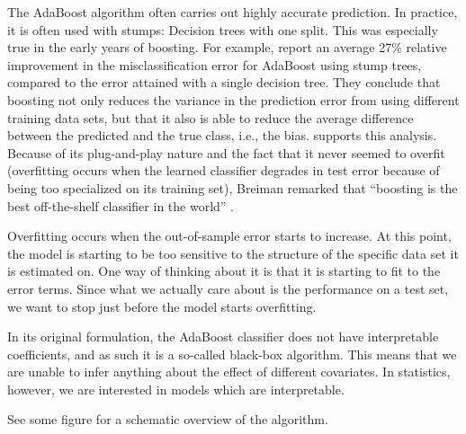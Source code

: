 The AdaBoost algorithm often carries out highly accurate prediction. In practice, it is often used with stumps: Decision trees with one split. This was especially true in the early years of boosting. For example, \citet{bauer-kohavi} report an average 27\% relative improvement in the misclassification error for AdaBoost using stump trees, compared to the error attained with a single decision tree. They conclude that boosting not only reduces the variance in the prediction error from using different training data sets, but that it also is able to reduce the average difference between the predicted and the true class, i.e., the bias. \citet{breiman1998} supports this analysis. Because of its plug-and-play nature and the fact that it never seemed to overfit (overfitting occurs when the learned classifier degrades in test error because of being too specialized on its training set), Breiman remarked that ``boosting is the best off-the-shelf classifier in the world'' \citep{ESL}.

Overfitting occurs when the out-of-sample error starts to increase. At this point, the model is starting to be too sensitive to the structure of the specific data set it is estimated on. One way of thinking about it is that it is starting to fit to the error terms. Since what we actually care about is the performance on a test set, we want to stop just before the model starts overfitting.

In its original formulation, the AdaBoost classifier does not have interpretable coefficients, and as such it is a so-called black-box algorithm. This means that we are unable to infer anything about the effect of different covariates. In statistics, however, we are interested in models which are interpretable.

See some figure for a schematic overview of the algorithm.

